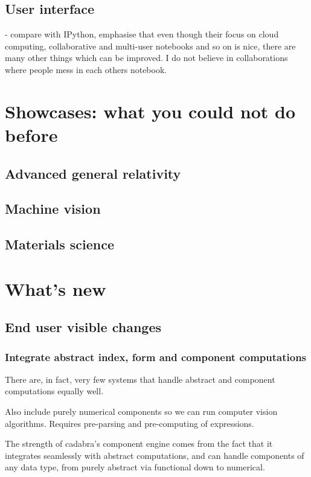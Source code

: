 \documentclass[11pt]{article}
\begin{document}
\subsection{User interface}

- compare with IPython, emphasise that even though their focus on
cloud computing, collaborative and multi-user notebooks and so on is
nice, there are many other things which can be improved. I do not 
believe in collaborations where people mess in each others notebook.


\section{Showcases: what you could not do before}
\subsection{Advanced general relativity}
\subsection{Machine vision}
\subsection{Materials science}

\section{What's new}
\subsection{End user visible changes}
\subsubsection{Integrate abstract index, form and component computations}

There are, in fact, very few systems that handle abstract and
component computations equally well.

Also include purely numerical components so we can run computer vision
algorithms. Requires pre-parsing and pre-computing of expressions.

The strength of cadabra's component engine comes from the fact that it
integrates seamlessly with abstract computations, and can handle
components of any data type, from purely abstract via functional down
to numerical.
\end{document}
